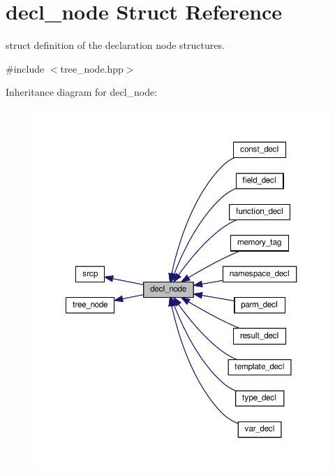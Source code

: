 \hypertarget{structdecl__node}{}\section{decl\+\_\+node Struct Reference}
\label{structdecl__node}


struct definition of the declaration node structures.  




{\ttfamily \#include $<$tree\+\_\+node.\+hpp$>$}



Inheritance diagram for decl\+\_\+node\+:
\nopagebreak
\begin{figure}[H]
\begin{center}
\leavevmode
\includegraphics[width=350pt]{d1/dc0/structdecl__node__inherit__graph}
\end{center}
\end{figure}


